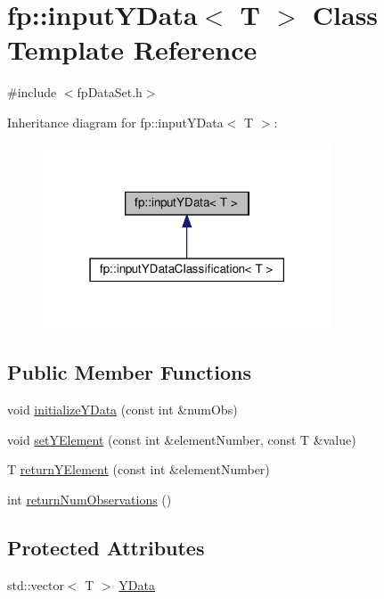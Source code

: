 \hypertarget{classfp_1_1inputYData}{}\section{fp\+:\+:input\+Y\+Data$<$ T $>$ Class Template Reference}
\label{classfp_1_1inputYData}


{\ttfamily \#include $<$fp\+Data\+Set.\+h$>$}



Inheritance diagram for fp\+:\+:input\+Y\+Data$<$ T $>$\+:
\nopagebreak
\begin{figure}[H]
\begin{center}
\leavevmode
\includegraphics[width=243pt]{classfp_1_1inputYData__inherit__graph}
\end{center}
\end{figure}
\subsection*{Public Member Functions}
\begin{DoxyCompactItemize}
\item 
void \hyperlink{classfp_1_1inputYData_a9bb60b2b0070ae39ad53088f1bcf9e87}{initialize\+Y\+Data} (const int \&num\+Obs)
\item 
void \hyperlink{classfp_1_1inputYData_a5830f9e71d181554f498feaa297885ee}{set\+Y\+Element} (const int \&element\+Number, const T \&value)
\item 
T \hyperlink{classfp_1_1inputYData_a974ab138d49f7e5b3fded09f02486710}{return\+Y\+Element} (const int \&element\+Number)
\item 
int \hyperlink{classfp_1_1inputYData_a6f6c2742745fd59daafef4e51d76400a}{return\+Num\+Observations} ()
\end{DoxyCompactItemize}
\subsection*{Protected Attributes}
\begin{DoxyCompactItemize}
\item 
std\+::vector$<$ T $>$ \hyperlink{classfp_1_1inputYData_af9a5f5190739918b5b5b209ef3b18de3}{Y\+Data}
\end{DoxyCompactItemize}


